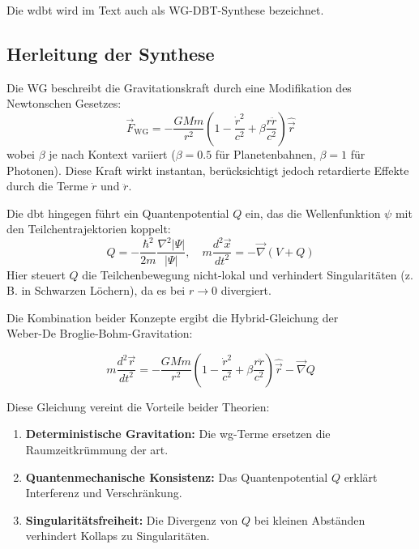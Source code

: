 Die \gls{wdbt} wird im Text auch als WG-DBT-Synthese bezeichnet.

\subsection{Herleitung der Synthese}
Die WG beschreibt die Gravitationskraft durch eine Modifikation des Newtonschen Gesetzes:
\begin{equation}
    \label{eq:wg-dbt}
    \vec{F}_{\text{WG}} = -\frac{GMm}{r^2}\left(1 - \frac{\dot{r}^2}{c^2} + \beta \frac{r\ddot{r}}{c^2}\right)\hat{\vec{r}}
\end{equation}
wobei $\beta$ je nach Kontext variiert ($\beta=0.5$ für Planetenbahnen, $\beta=1$ für Photonen). Diese Kraft wirkt instantan, berücksichtigt jedoch retardierte Effekte durch die
Terme $\dot{r}$ und $\ddot{r}$.

Die \gls{dbt} hingegen führt ein Quantenpotential $Q$ ein, das die Wellenfunktion $\psi$ mit den Teilchentrajektorien koppelt:
\begin{equation}
    Q = -\frac{\hbar^2}{2m}\frac{\nabla^2 |\Psi|}{|\Psi|}, \quad m\frac{d^2\vec{x}}{dt^2} = -\vec{\nabla}(V + Q)
\end{equation}
Hier steuert $Q$ die Teilchenbewegung nicht-lokal und verhindert Singularitäten (z. B. in Schwarzen Löchern), da es bei $r \to 0$ divergiert.

Die Kombination beider Konzepte ergibt die Hybrid-Gleichung der\\Weber-De Broglie-Bohm-Gravitation:

\begin{equation}
    m\frac{d^2\vec{r}}{dt^2} = -\frac{GMm}{r^2}\left(1 - \frac{\dot{r}^2}{c^2} + \beta \frac{r\ddot{r}}{c^2}\right)\hat{{\vec{r}}} - \vec{\nabla} Q
\end{equation}

Diese Gleichung vereint die Vorteile beider Theorien:
\begin{enumerate}
    \item \textbf{Deterministische Gravitation:} Die \gls{wg}-Terme ersetzen die Raumzeitkrümmung der \gls{art}.
    \item \textbf{Quantenmechanische Konsistenz:} Das Quantenpotential $Q$ erklärt Interferenz und Verschränkung.
    \item \textbf{Singularitätsfreiheit:} Die Divergenz von $Q$ bei kleinen Abständen verhindert Kollaps zu Singularitäten.
\end{enumerate}

\newpage
